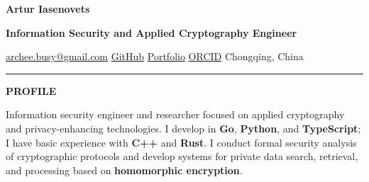 \documentclass[11pt,a4paper]{article}
\newcommand{\cvrow}[2]{%
  \noindent
  \begin{minipage}[t]{0.145\textwidth}
    \vspace{0pt}%
    \raggedright
    \fontsize{8.5}{10}\selectfont
    \bfseries\MakeUppercase{#1}
  \end{minipage}%
  \hfill
  \begin{minipage}[t]{0.835\textwidth}
    \vspace{0pt}%
    #2
  \end{minipage}\par
}
\begin{document}
{\fontsize{24}{28}\selectfont\bfseries Artur Iasenovets}\par
\vspace{0.08em}
{\large\bfseries Information Security and Applied Cryptography Engineer}\par
\vspace{0.28em}
\href{mailto:archee.busy@gmail.com}{archee.busy@gmail.com}
\;\textbullet\;
\href{https://github.com/iasenovets}{GitHub}
\;\textbullet\;
\href{https://iasenovets.github.io/}{Portfolio}
\;\textbullet\;
\href{https://orcid.org/0009-0008-0008-3746}{ORCID}
\;\textbullet\;
Chongqing, China
\par
\vspace{0.22em}
\hrule
\vspace{0.55em}

\cvrow{Profile}{%
  Information security engineer and researcher focused on applied cryptography
  and privacy-enhancing technologies. I develop in \textbf{Go},
  \textbf{Python}, and \textbf{TypeScript}; I have basic experience with
  \textbf{C++} and \textbf{Rust}. I conduct formal security analysis of
  cryptographic protocols and develop systems for private data search,
  retrieval, and processing based on \textbf{homomorphic encryption}.
}

\vspace{0.50em}
\end{document}
